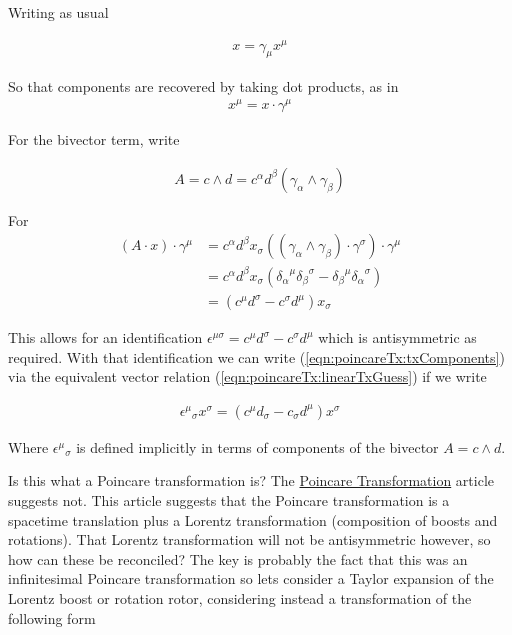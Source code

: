 Writing as usual

\begin{align*}
x = \gamma_\mu x^\mu
\end{align*}

So that components are recovered by taking dot products, as in
\begin{align*}
x^\mu = x \cdot \gamma^\mu
\end{align*}

For the bivector term, write

\begin{align*}
A = c \wedge d = c^\alpha d^\beta (\gamma_\alpha \wedge \gamma_\beta)
\end{align*}

For
\begin{align*}
(A \cdot x ) \cdot \gamma^\mu 
&=
c^\alpha d^\beta x_\sigma ((\gamma_\alpha \wedge \gamma_\beta) \cdot \gamma^\sigma) \cdot \gamma^\mu \\
&=
c^\alpha d^\beta x_\sigma ( {\delta_\alpha}^\mu {\delta_\beta}^\sigma -{\delta_\beta}^\mu {\delta_\alpha}^\sigma ) \\
&=
(c^\mu d^\sigma -c^\sigma d^\mu ) x_\sigma 
\end{align*}

This allows for an identification $\epsilon^{\mu\sigma} = c^\mu d^\sigma -c^\sigma d^\mu$ which is antisymmetric as required.  With that identification we can write (\ref{eqn:poincareTx:txComponents}) via the equivalent vector relation (\ref{eqn:poincareTx:linearTxGuess}) if we write

\begin{align*}
{\epsilon^\mu}_\sigma x^\sigma = (c^\mu d_\sigma -c_\sigma d^\mu ) x^\sigma 
\end{align*}

Where ${\epsilon^\mu}_\sigma$ is defined implicitly in terms of components of the bivector $A = c \wedge d$.

Is this what a Poincare transformation is?  The \href{http://mathworld.wolfram.com/PoincareTransformation.html}{Poincare Transformation} article suggests not.  This article suggests that the Poincare transformation is a spacetime translation plus a Lorentz transformation (composition of boosts and rotations).  That Lorentz transformation will not be antisymmetric however, so how can these be reconciled?  The key is probably the fact that this was an infinitesimal Poincare transformation so lets consider a Taylor expansion of the Lorentz boost or rotation rotor, considering instead a transformation of the following form

